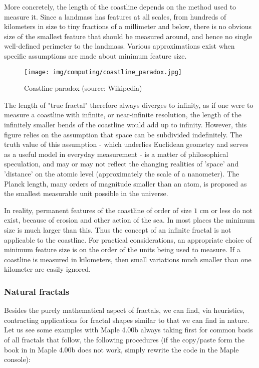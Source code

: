 	More concretely, the length of the coastline depends on the method used to measure it. Since a landmass has features at all scales, from hundreds of kilometers in size to tiny fractions of a millimeter and below, there is no obvious size of the smallest feature that should be measured around, and hence no single well-defined perimeter to the landmass. Various approximations exist when specific assumptions are made about minimum feature size.
	\begin{figure}[H]
		\centering
		\texttt{[image: img/computing/coastline\_paradox.jpg]}
		\caption[Coastline paradox]{Coastline paradox (source: Wikipedia)}
	\end{figure}
	The length of "true fractal" therefore always diverges to infinity, as if one were to measure a coastline with infinite, or near-infinite resolution, the length of the infinitely smaller bends of the coastline would add up to infinity. However, this figure relies on the assumption that space can be subdivided indefinitely. The truth value of this assumption - which underlies Euclidean geometry and serves as a useful model in everyday measurement - is a matter of philosophical speculation, and may or may not reflect the changing realities of 'space' and 'distance' on the atomic level (approximately the scale of a nanometer). The Planck length, many orders of magnitude smaller than an atom, is proposed as the smallest measurable unit possible in the universe.

	In reality, permanent features of the coastline of order of size $1$ cm or less do not exist, because of erosion and other action of the sea. In most places the minimum size is much larger than this. Thus the concept of an infinite fractal is not applicable to the coastline.
For practical considerations, an appropriate choice of minimum feature size is on the order of the units being used to measure. If a coastline is measured in kilometers, then small variations much smaller than one kilometer are easily ignored.

	
	
	\subsubsection{Natural fractals}
	Besides the purely mathematical aspect of fractals, we can find, via heuristics, contracting applications for fractal shapes similar to that we can find in nature. Let us see some examples with Maple 4.00b always taking first for common basis of all fractals that follow, the following procedures (if the copy/paste form the book in in Maple 4.00b does not work, simply rewrite the code in the Maple console):
	
